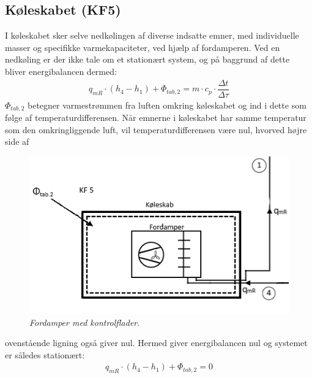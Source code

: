 \documentclass[../Hovedrapport.tex]{subfiles}
\begin{document}
\subsection{Køleskabet (KF5)}
\begin{minipage}[t]{0.5\textwidth}
I køleskabet sker selve nedkølingen af diverse indsatte emner, med individuelle masser og specifikke varmekapaciteter, ved hjælp af fordamperen. Ved en nedkøling er der ikke tale om et stationært system, og på baggrund af dette bliver energibalancen dermed:
\begin{align}
\label{eq:Skab}
q_{mR} \cdot (h_4-h_1) + \Phi_{tab,2} =  {m \cdot c_p \cdot \dfrac{\Delta t}{\Delta \tau}}
\end{align}
$\Phi_{tab,2}$ betegner varmestrømmen fra luften omkring køleskabet og ind i dette som følge af temperaturdifferensen. Når emnerne i køleskabet har samme temperatur som den omkringliggende luft, vil temperaturdifferensen være nul, hvorved højre side af 
\end{minipage}
\begin{minipage}[t]{0.5\textwidth}
\begin{figure}[H] %
	\centering
	\includegraphics[width=1\textwidth]{Billeder/KF_5.png}
	\caption{\textit{Fordamper med kontrolflader}.}
	\label{fig:Skab-KF}
\end{figure}
\end{minipage}
ovenstående ligning også giver nul. Hermed giver energibalancen nul og systemet er således stationært:
\begin{align}
\label{eq:Skab}
q_{mR} \cdot (h_4-h_1) + \Phi_{tab,2} = 0
\end{align}
\end{document}
